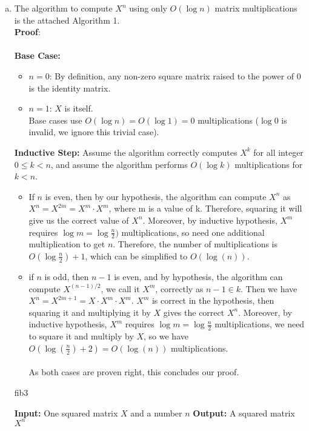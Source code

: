 \documentclass[10pt]{article}
\begin{document}
{\begin{enumerate}[(a)]
    \item The algorithm to compute \( X^n \) using only \( O(\log n) \) matrix multiplications is the attached Algorithm 1. \\
    \textbf{Proof}: \\
          \\\textbf{Base Case:} 
          \begin{itemize}
              \item $n = 0$: By definition, any non-zero square matrix raised to the power of $0$ is the identity matrix.
              \item $n = 1$: $X$ is itself. 
              \\ Base cases use $O(\log{n}) = O(\log{1}) = 0$ multiplications ($\log{0}$ is invalid, we ignore this trivial case).
          \end{itemize}
          \textbf{Inductive Step:} Assume the algorithm correctly computes $X^k$ for all integer $0\leq k<n$, and assume the algorithm performs $O(\log{k})$ multiplications for $k<n$.
          \begin{itemize}
              \item If $n$ is even, then by our hypothesis, the algorithm can compute $X^n$ as $X^n= X^{2m} = X^m \cdot X^m$, where  m is a value of k. Therefore, squaring it will give us the correct value of $X^n$. Moreover, by inductive hypothesis, $X^m$ requires $\log{m} = \log{\frac{n}{2}})$ multiplications, so need one additional multiplication to get $n$. Therefore, the number of multiplications is $O(\log{\frac{n}{2}}) + 1$, which can be simplified to $O(\log(n))$.
              \item if $n$ is odd, then $n-1$ is even, and by hypothesis, the algorithm can compute $X^{(n-1)/2}$, we call it $X^m$, correctly as $n-1 \in k$. Then we have $X^n = X^{2m+1} = X \cdot X^m \cdot X^m$. $X^m$ is correct in the hypothesis, then squaring it and multiplying it by $X$ gives the correct $X^n$. Moreover, by inductive hypothesis, $X^m$ requires $\log{m} = \log{\frac{n}{2}}$ multiplications, we need to square it and multiply by $X$, so we have $O(\log(\frac{n}{2}) + 2) = O(\log(n))$ multiplications.
              \\\\As both cases are proven right, this concludes our proof.
          \end{itemize} 
          

    \begin{algorithm}
        \caption{fib3} 
        \begin{algorithmic}[1]
        \Statex \textbf{Input:} One squared matrix $X$ and a number $n$
        \Statex \textbf{Output:} A squared matrix $X^n$ 
            

\end{algorithmic}
\end{algorithm}
\end{enumerate}}
\end{document}
